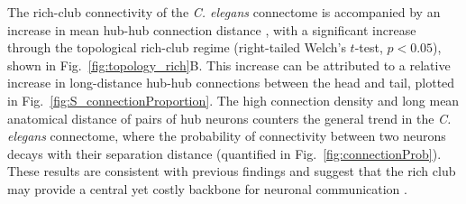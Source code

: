 \documentclass[10pt,letterpaper]{article}
\begin{document}
The rich-club connectivity of the \emph{C. elegans} connectome is accompanied by an increase in mean hub-hub connection distance \cite{Towlson2013}, with a significant increase through the topological rich-club regime (right-tailed Welch's $t$-test, $p < 0.05$), shown in Fig.~\ref{fig:topology_rich}B.
This increase can be attributed to a relative increase in long-distance hub-hub connections between the head and tail, plotted in Fig.~\ref{fig:S_connectionProportion}.
The high connection density and long mean anatomical distance of pairs of hub neurons counters the general trend in the \emph{C. elegans} connectome, where the probability of connectivity between two neurons decays with their separation distance (quantified in Fig.~\ref{fig:connectionProb}).
These results are consistent with previous findings \cite{Towlson2013} and suggest that the rich club may provide a central yet costly backbone for neuronal communication \cite{vandenHeuvel:2012kh}.

\end{document}
